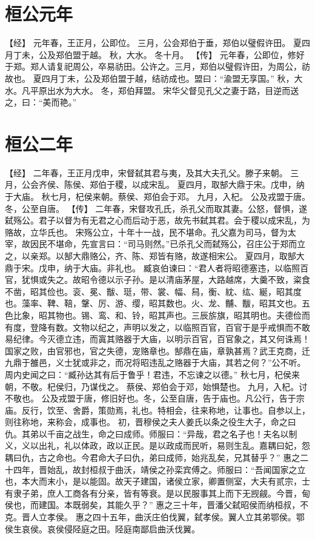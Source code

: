 \documentclass[a4paper,12pt,UTF8,twoside]{ctexbook}
\begin{document}
\section{桓公元年}

【经】
元年春，王正月，公即位。
三月，公会郑伯于垂，郑伯以璧假许田。
夏四月丁未，公及郑伯盟于越。
秋，大水。
冬十月。
【传】
元年春，公即位，修好于郑。郑人请复祀周公，卒易祊田。公许之。三月，郑伯以璧假许田，为周公，祊故也。
夏四月丁未，公及郑伯盟于越，结祊成也。盟曰：“渝盟无享国。”
秋，大水。凡平原出水为大水。
冬，郑伯拜盟。
宋华父督见孔父之妻于路，目逆而送之，曰：“美而艳。”

\section{桓公二年}

【经】
二年春，王正月戊申，宋督弑其君与夷，及其大夫孔父。滕子来朝。
三月，公会齐侯、陈侯、郑伯于稷，以成宋乱。
夏四月，取郜大鼎于宋。戊申，纳于大庙。
秋七月，杞侯来朝。蔡侯、郑伯会于邓。
九月，入杞。
公及戎盟于唐。冬，公至自唐。
【传】
二年春，宋督攻孔氏，杀孔父而取其妻。公怒，督惧，遂弑殇公。君子以督为有无君之心而后动于恶，故先书弑其君。会于稷以成宋乱，为赂故，立华氏也。
宋殇公立，十年十一战，民不堪命。孔父嘉为司马，督为太宰，故因民不堪命，先宣言曰：“司马则然。”已杀孔父而弑殇公，召庄公于郑而立之，以亲郑。以郜大鼎赂公，齐、陈、郑皆有赂，故遂相宋公。
夏四月，取郜大鼎于宋。戊申，纳于大庙。非礼也。
臧哀伯谏曰：“君人者将昭德塞违，以临照百官，犹惧或失之。故昭令德以示子孙。是以清庙茅屋，大路越席，大羹不致，粢食不凿，昭其俭也。衮、冕、黻、珽，带、裳、幅、舄，衡、紞、纮、綖，昭其度也。藻率、鞞、鞛，鞶、厉、游、缨，昭其数也。火、龙、黼、黻，昭其文也。五色比象，昭其物也。锡、鸾、和、铃，昭其声也。三辰旂旗，昭其明也。夫德俭而有度，登降有数。文物以纪之，声明以发之，以临照百官，百官于是乎戒惧而不敢易纪律。今灭德立违，而寘其赂器于大庙，以明示百官，百官象之，其又何诛焉！国家之败，由官邪也，官之失德，宠赂章也。郜鼎在庙，章孰甚焉？武王克商，迁九鼎于雒邑，义士犹或非之，而况将昭违乱之赂器于大庙，其若之何？”公不听。周内史闻之曰：“臧孙达其有后于鲁乎！君违，不忘谏之以德。”
秋七月，杞侯来朝，不敬。杞侯归，乃谋伐之。
蔡侯、郑伯会于邓，始惧楚也。
九月，入杞。讨不敬也。
公及戎盟于唐，修旧好也。冬，公至自唐，告于庙也。凡公行，告于宗庙。反行，饮至、舍爵，策勋焉，礼也。特相会，往来称地，让事也。自参以上，则往称地，来称会，成事也。
初，晋穆侯之夫人姜氏以条之役生大子，命之曰仇。其弟以千亩之战生，命之曰成师。师服曰：“异哉，君之名子也！夫名以制义，义以出礼，礼以体政，政以正民。是以政成而民听，易则生乱。嘉耦曰妃，怨耦曰仇，古之命也。今君命大子曰仇，弟曰成师，始兆乱矣，兄其替乎？”
惠之二十四年，晋始乱，故封桓叔于曲沃，靖侯之孙栾宾傅之。师服曰：“吾闻国家之立也，本大而末小，是以能固。故天子建国，诸侯立家，卿置侧室，大夫有贰宗，士有隶子弟，庶人工商各有分亲，皆有等衰。是以民服事其上而下无觊觎。今晋，甸侯也，而建国。本既弱矣，其能久乎？”
惠之三十年，晋潘父弑昭侯而纳桓叔，不克。晋人立孝侯。
惠之四十五年，曲沃庄伯伐翼，弑孝侯。翼人立其弟鄂侯。鄂侯生哀侯。哀侯侵陉庭之田。陉庭南鄙启曲沃伐翼。
\end{document}
